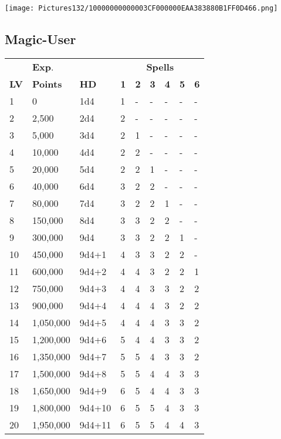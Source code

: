 \documentclass[a4paper,twoside,openany,10pt]{book}
\begin{document}
\begin{multicols}{2}
\addvspace{0.8cm}

\texttt{[image: Pictures132/10000000000003CF000000EAA383880B1FF0D466.png]}


\subsection{Magic-User}\label{magic-user}

\begin{tabular*}{0.93\linewidth}{@{\extracolsep{\fill}}lllllllll}
& \textbf{Exp}. & & \multicolumn{6}{c}{\textbf{Spells}} \\
\textbf{LV} & \textbf{Points} & \textbf{HD} & \textbf{1} & \textbf{2} & \textbf{3} & \textbf{4} & \textbf{5} & \textbf{6} \\\toprule
1 & 0 & 1d4 & 1 & - & - & - & - & - \\\hline
2 & 2,500 & 2d4 & 2 & - & - & - & - & - \\\hline
3 & 5,000 & 3d4 & 2 & 1 & - & - & - & - \\\hline
4 & 10,000 & 4d4 & 2 & 2 & - & - & - & - \\\hline
5 & 20,000 & 5d4 & 2 & 2 & 1 & - & - & - \\\hline
6 & 40,000 & 6d4 & 3 & 2 & 2 & - & - & - \\\hline
7 & 80,000 & 7d4 & 3 & 2 & 2 & 1 & - & - \\\hline
8 & 150,000 & 8d4 & 3 & 3 & 2 & 2 & - & - \\\hline
9 & 300,000 & 9d4 & 3 & 3 & 2 & 2 & 1 & - \\\hline
10 & 450,000 & 9d4+1 & 4 & 3 & 3 & 2 & 2 & - \\\hline
11 & 600,000 & 9d4+2 & 4 & 4 & 3 & 2 & 2 & 1 \\\hline
12 & 750,000 & 9d4+3 & 4 & 4 & 3 & 3 & 2 & 2 \\\hline
13 & 900,000 & 9d4+4 & 4 & 4 & 4 & 3 & 2 & 2 \\\hline
14 & 1,050,000 & 9d4+5 & 4 & 4 & 4 & 3 & 3 & 2 \\\hline
15 & 1,200,000 & 9d4+6 & 5 & 4 & 4 & 3 & 3 & 2 \\\hline
16 & 1,350,000 & 9d4+7 & 5 & 5 & 4 & 3 & 3 & 2 \\\hline
17 & 1,500,000 & 9d4+8 & 5 & 5 & 4 & 4 & 3 & 3 \\\hline
18 & 1,650,000 & 9d4+9 & 6 & 5 & 4 & 4 & 3 & 3 \\\hline
19 & 1,800,000 & 9d4+10 & 6 & 5 & 5 & 4 & 3 & 3 \\\hline
20 & 1,950,000 & 9d4+11 & 6 & 5 & 5 & 4 & 4 & 3 \\\bottomrule
\end{tabular*}\medskip


\end{multicols}
\end{document}
